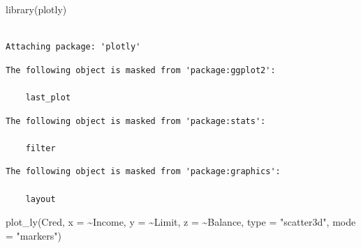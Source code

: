 \documentclass[
  letterpaper,
  DIV=11,
  numbers=noendperiod]{scrartcl}
\newenvironment{Shaded}{\begin{snugshade}}{\end{snugshade}}
\newcommand{\AttributeTok}[1]{\textcolor[rgb]{0.40,0.45,0.13}{#1}}
\newcommand{\FunctionTok}[1]{\textcolor[rgb]{0.28,0.35,0.67}{#1}}
\newcommand{\NormalTok}[1]{\textcolor[rgb]{0.00,0.23,0.31}{#1}}
\newcommand{\SpecialCharTok}[1]{\textcolor[rgb]{0.37,0.37,0.37}{#1}}
\newcommand{\StringTok}[1]{\textcolor[rgb]{0.13,0.47,0.30}{#1}}
\begin{document}
\begin{Shaded}
\begin{Highlighting}[]
\FunctionTok{library}\NormalTok{(plotly)}
\end{Highlighting}
\end{Shaded}

\begin{verbatim}

Attaching package: 'plotly'
\end{verbatim}

\begin{verbatim}
The following object is masked from 'package:ggplot2':

    last_plot
\end{verbatim}

\begin{verbatim}
The following object is masked from 'package:stats':

    filter
\end{verbatim}

\begin{verbatim}
The following object is masked from 'package:graphics':

    layout
\end{verbatim}

\begin{Shaded}
\begin{Highlighting}[]
\FunctionTok{plot\_ly}\NormalTok{(Cred, }\AttributeTok{x =} \SpecialCharTok{\textasciitilde{}}\NormalTok{Income, }\AttributeTok{y =} \SpecialCharTok{\textasciitilde{}}\NormalTok{Limit, }\AttributeTok{z =} \SpecialCharTok{\textasciitilde{}}\NormalTok{Balance,}
        \AttributeTok{type =} \StringTok{"scatter3d"}\NormalTok{, }\AttributeTok{mode =} \StringTok{"markers"}\NormalTok{)}
\end{Highlighting}
\end{Shaded}
\end{document}
